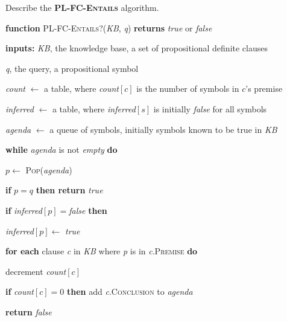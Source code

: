 \begin{flashcard}[Question]{Describe the \textbf{\textsc{PL-FC-Entails}} algorithm.}
\footnotesize
\begin{center}
\begin{minipage}{0.9\textwidth}
\textbf{function} \textsc{PL-FC-Entails?}(\textit{KB}, \textit{q}) \textbf{returns} \textit{true} or \textit{false}

\quad \textbf{inputs:} \textit{KB}, the knowledge base, a set of propositional definite clauses

\quad \quad \quad \quad \quad \textit{q}, the query, a propositional symbol

\medskip

\quad \textit{count} $\leftarrow$ a table, where \textit{count}$[c]$ is the number of symbols in $c$'s premise

\quad \textit{inferred} $\leftarrow$ a table, where \textit{inferred}$[s]$ is initially \textit{false} for all symbols

\quad \textit{agenda} $\leftarrow$ a queue of symbols, initially symbols known to be true in \textit{KB}

\medskip

\quad \textbf{while} \textit{agenda} is not \textit{empty} \textbf{do}

\quad \quad $p \leftarrow$ \textsc{Pop}(\textit{agenda})

\quad \quad \textbf{if} $p=q$ \textbf{then return} \textit{true}

\quad \quad \textbf{if} \textit{inferred}$[p] = $\textit{false} \textbf{then}

\quad \quad \quad \textit{inferred}$[p] \leftarrow$ \textit{true}

\quad \quad \quad \textbf{for each} clause \textit{c} in \textit{KB} where \textit{p} is in \textit{c}.\textsc{Premise} \textbf{do}

\quad \quad \quad \quad decrement \textit{count}$[c]$

\quad \quad \quad \quad \textbf{if} \textit{count}$[c] = 0$ \textbf{then} add \textit{c}.\textsc{Conclusion} to \textit{agenda}

\quad \textbf{return} \textit{false}
\end{minipage}
\end{center}
\end{flashcard}

